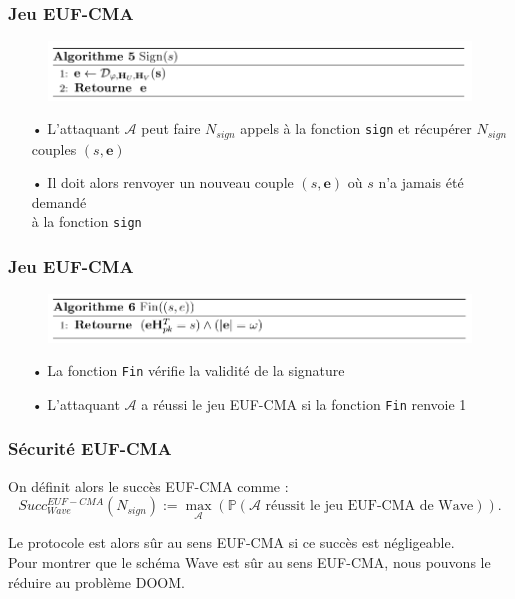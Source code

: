 \documentclass[10pt,a4paper]{beamer}
\theoremstyle{plain}
\theoremstyle{definition}
\newcommand{\e}{\mathbf{e}}
\begin{document}
\begin{frame}[fragile]
\frametitle{Jeu EUF-CMA}	
\begin{figure}[h]
		\includegraphics[width=\textwidth]{sign.png}
\end{figure}

\vspace{0.1in}

\begin{itemize}
\item[•] L'attaquant $\mathcal{A}$ peut faire $N_{sign}$ appels à la fonction \verb|sign| et récupérer $N_{sign}$ couples $(s,\e)$
\vspace{0.1in}
\item[•] Il doit alors renvoyer un nouveau couple $(s,\e)$ où $s$ n'a jamais été demandé \\à la fonction \verb|sign|
\end{itemize}

\end{frame}

\begin{frame}[fragile]
\frametitle{Jeu EUF-CMA}	
\begin{figure}[h]
		\includegraphics[width=\textwidth]{fin.png}
\end{figure}

\vspace{0.1in}

\begin{itemize}
\item[•] La fonction \verb|Fin| vérifie la validité de la signature
\vspace{0.1in}
\item[•] L'attaquant $\mathcal{A}$ a réussi le jeu EUF-CMA si la fonction \verb|Fin| renvoie 1
\end{itemize}
\end{frame}

\begin{frame}[fragile]
\frametitle{Sécurité EUF-CMA}
\begin{block}{}
On définit alors le succès EUF-CMA comme :
$$Succ^{EUF-CMA}_{Wave}(N_{sign}) := \max_{\mathcal{A}}(\mathbb{P}(\mathcal{A}\text{ réussit le jeu EUF-CMA de Wave})).$$
\end{block}	
\vspace{0.2in}
Le protocole est alors sûr au sens EUF-CMA si ce succès est négligeable. \\
\vspace{0.2in}
Pour montrer que le schéma Wave est sûr au sens EUF-CMA, nous pouvons le réduire au problème DOOM.\\
\end{frame}
\end{document}
